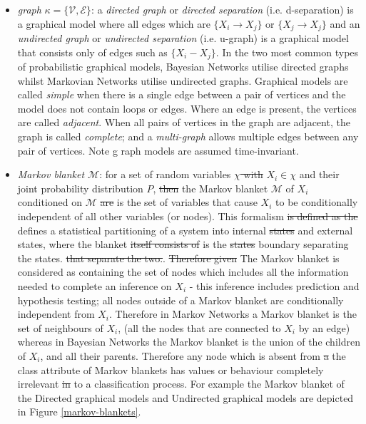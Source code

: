 \documentclass[7pt]{article}
\begin{document}
\begin{itemize}
\begin{itemize}
	\end{itemize}
	\item \emph{graph} $\mathcal{\kappa} = \{\mathcal{V},\mathcal{E} \}$: a  \emph{directed graph} or \emph{directed separation} (i.e. d-separation) is a graphical model where all edges which are $\{X_i \rightarrow X_j\}$ or $\{X_j \rightarrow X_j\}$ and an \emph{undirected graph} or \emph{undirected separation} (i.e. u-graph) is a graphical model that consists only of edges such as $\{X_i - X_j\}$. In the two most common types of probabilistic graphical models, Bayesian Networks utilise directed graphs whilst Markovian Networks utilise undirected graphs.  Graphical models are called \emph{simple} when there is a single edge between a pair of vertices and the model does not contain loops or edges. Where an edge is present, the vertices are called \emph{adjacent}. When all pairs of vertices in the graph are adjacent, the graph is called \emph{complete}; and a \emph{multi-graph} allows multiple edges between any pair of vertices. Note g raph models are assumed time-invariant.
	
	\item \emph{Markov blanket $\mathcal{M}$}: for a set of random variables \st{$\chi$ with} $X_i \in \chi$ and their joint probability distribution $P$, \st{then} the {Markov blanket} $\mathcal{M}$ of $X_i$ conditioned on $\mathcal{M}$ \st{are} is the set of variables that cause $X_i$ to be conditionally independent of all other variables (or nodes). This formalism \st{is defined as the} defines a statistical partitioning of a system into internal \st{states} and external states, where the blanket \st{itself consists of} is the \st{states} boundary separating the states. \st{that separate the two.}. \st{Therefore given} The {Markov blanket}  is considered as containing the set of nodes which includes all the information needed to complete an inference on $X_i$ - this inference includes prediction and hypothesis testing; all nodes outside of a Markov blanket are conditionally independent from $X_i$. Therefore in Markov Networks a {Markov blanket}  is the set of neighbours of $X_i$, (all the nodes that are connected to $X_i$ by an edge) whereas in Bayesian Networks the Markov blanket is the union of the children of $X_i$, and all their parents. Therefore any node which is absent from \st{a} the class attribute of Markov blankets has values or behaviour completely irrelevant \st{in} to a classification process. For example the Markov blanket of the {Directed graphical models} and {Undirected graphical models} are depicted in Figure \ref{markov-blankets}.
\end{itemize}
\end{document}

